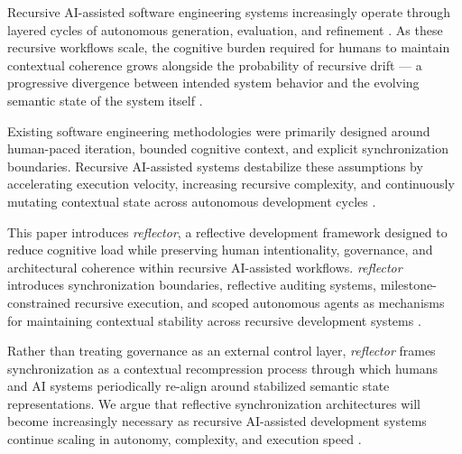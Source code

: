 Recursive AI-assisted software engineering systems increasingly operate through layered cycles of autonomous generation, evaluation, and refinement \cite{Chen2021Codex,Jimenez2024SWEBench,Yang2024SWEAgent}. As these recursive workflows scale, the cognitive burden required for humans to maintain contextual coherence grows alongside the probability of recursive drift — a progressive divergence between intended system behavior and the evolving semantic state of the system itself \cite{Simon1957ModelsMan,Sweller1988CognitiveLoad,Hutchins1995CognitionWild}.

Existing software engineering methodologies were primarily designed around human-paced iteration, bounded cognitive context, and explicit synchronization boundaries. Recursive AI-assisted systems destabilize these assumptions by accelerating execution velocity, increasing recursive complexity, and continuously mutating contextual state across autonomous development cycles \cite{Brooks1987NoSilverBullet,Parnas1972Modularization}.

This paper introduces \textit{reflector}, a reflective development framework designed to reduce cognitive load while preserving human intentionality, governance, and architectural coherence within recursive AI-assisted workflows. \textit{reflector} introduces synchronization boundaries, reflective auditing systems, milestone-constrained recursive execution, and scoped autonomous agents as mechanisms for maintaining contextual stability across recursive development systems \cite{Wiener1948Cybernetics,Beer1972BrainFirm,Amershi2014InteractiveML,Shneiderman2020HCAI}.

Rather than treating governance as an external control layer, \textit{reflector} frames synchronization as a contextual recompression process through which humans and AI systems periodically re-align around stabilized semantic state representations. We argue that reflective synchronization architectures will become increasingly necessary as recursive AI-assisted development systems continue scaling in autonomy, complexity, and execution speed \cite{Lamport1978TimeClocks,Chandy1985DistributedSnapshots,Vogels2009EventuallyConsistent}.
